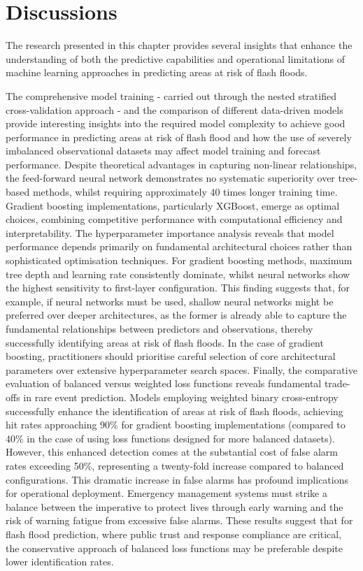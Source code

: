 \documentclass[nhess, manuscript]{copernicus}
\begin{document}
\section{Discussions}
\label{data_driven_flash_floods_short_medium_range_discussions}

The research presented in this chapter provides several insights that enhance the understanding of both the predictive capabilities and operational limitations of machine learning approaches in predicting areas at risk of flash floods. 

The comprehensive model training - carried out through the nested stratified cross-validation approach - and the comparison of different data-driven models provide interesting insights into the required model complexity to achieve good performance in predicting areas at risk of flash flood and how the use of severely imbalanced observational datasets may affect model training and forecast performance. Despite theoretical advantages in capturing non-linear relationships, the feed-forward neural network demonstrates no systematic superiority over tree-based methods, whilst requiring approximately 40 times longer training time. Gradient boosting implementations, particularly XGBoost, emerge as optimal choices, combining competitive performance with computational efficiency and interpretability. The hyperparameter importance analysis reveals that model performance depends primarily on fundamental architectural choices rather than sophisticated optimisation techniques. For gradient boosting methods, maximum tree depth and learning rate consistently dominate, whilst neural networks show the highest sensitivity to first-layer configuration. This finding suggests that, for example, if neural networks must be used, shallow neural networks might be preferred over deeper architectures, as the former is already able to capture the fundamental relationships between predictors and observations, thereby successfully identifying areas at risk of flash floods. In the case of gradient boosting, practitioners should prioritise careful selection of core architectural parameters over extensive hyperparameter search spaces. Finally, the comparative evaluation of balanced versus weighted loss functions reveals fundamental trade-offs in rare event prediction. Models employing weighted binary cross-entropy successfully enhance the identification of areas at risk of flash floods, achieving hit rates approaching 90\% for gradient boosting implementations (compared to 40\% in the case of using loss functions designed for more balanced datasets). However, this enhanced detection comes at the substantial cost of false alarm rates exceeding 50\%, representing a twenty-fold increase compared to balanced configurations. This dramatic increase in false alarms has profound implications for operational deployment. Emergency management systems must strike a balance between the imperative to protect lives through early warning and the risk of warning fatigue from excessive false alarms. These results suggest that for flash flood prediction, where public trust and response compliance are critical, the conservative approach of balanced loss functions may be preferable despite lower identification rates. 
\end{document}
